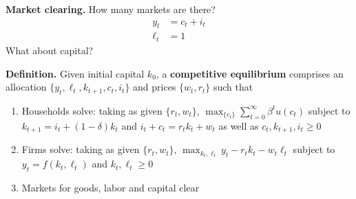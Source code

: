 \documentclass[11pt, aspectratio=169]{beamer}
\begin{document}
\begin{frame}{}

\vspace{4mm}
\textbf{Market clearing.} How many markets are there? 
\begin{align*}
	y_t &= c_t + i_t \\
	\ell_t &= 1 
\end{align*}
What about capital?

\vspace{5mm}
\textbf{Definition.} Given initial capital $k_0$, a \textbf{competitive equilibrium} comprises an allocation $\{y_t, \ell_t, k_{t+1}, c_t, i_t\}$ and prices $\{w_t, r_t\}$ such that
\begin{enumerate}
	\item Households solve: taking as given $\{r_t, w_t\}$, $\max_{\{c_t\}} \sum_{t = 0}^\infty \beta^t u(c_t)$ subject to $k_{t+1} = i_t + (1 - \delta) k_t$ and $i_t + c_t = r_t k_t + w_t$ as well as $c_t, k_{t+1}, i_t \geq 0$

	\item Firms solve: taking as given $\{r_t, w_t\}$, $\max_{k_t, \ell_t} y_t - r_t k_t - w_t \ell_t$ subject to $y_t = f(k_t, \ell_t)$ and $k_t, \ell_t \geq 0$

	\item Markets for goods, labor and capital clear
\end{enumerate}

\end{frame}
\end{document}
